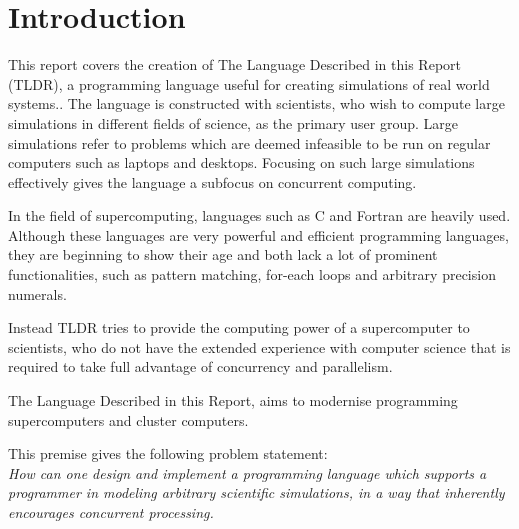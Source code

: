 \chapter{Introduction}\label{part:introduction}

This report covers the creation of The Language Described in this Report (TLDR), a programming language useful for creating simulations of real world systems.. The language is constructed with scientists, who wish to compute large simulations in different fields of science, as the primary user group. Large simulations refer to problems which are deemed infeasible to be run on regular computers such as laptops and desktops. Focusing on such large simulations effectively gives the language a subfocus on concurrent computing.

In the field of supercomputing, languages such as C and Fortran are heavily used. Although these languages  are very powerful and efficient programming languages, they are beginning to show their age and both lack a lot of prominent functionalities, such as pattern matching, for-each loops and arbitrary precision numerals. 

Instead TLDR tries to provide the computing power of a supercomputer to scientists, who do not have the extended experience with computer science that is required to take full advantage of concurrency and parallelism.

The Language Described in this Report, aims to modernise programming supercomputers and cluster computers.

This premise gives the following problem statement:
\\

\emph{How can one design and implement a programming language which supports a programmer in modeling arbitrary scientific simulations, in a way that inherently encourages concurrent processing.}
